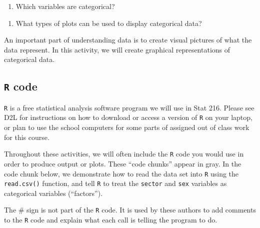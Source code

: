 \documentclass[
]{report}
\newenvironment{Shaded}{\begin{snugshade}}{\end{snugshade}}
\newcommand{\CommentTok}[1]{\textcolor[rgb]{0.56,0.35,0.01}{\textit{#1}}}
\newcommand{\KeywordTok}[1]{\textcolor[rgb]{0.13,0.29,0.53}{\textbf{#1}}}
\newcommand{\NormalTok}[1]{#1}
\newcommand{\OperatorTok}[1]{\textcolor[rgb]{0.81,0.36,0.00}{\textbf{#1}}}
\newcommand{\StringTok}[1]{\textcolor[rgb]{0.31,0.60,0.02}{#1}}
\providecommand{\tightlist}{%
  \setlength{\itemsep}{0pt}\setlength{\parskip}{0pt}}
\begin{document}
\vspace{0.2in}

\begin{enumerate}
\def\labelenumi{\arabic{enumi}.}
\setcounter{enumi}{1}
\tightlist
\item
  Which variables are categorical?
\end{enumerate}

\vspace{0.4in}

\begin{enumerate}
\def\labelenumi{\arabic{enumi}.}
\setcounter{enumi}{2}
\tightlist
\item
  What types of plots can be used to display categorical data?
\end{enumerate}

\vspace{0.5in}

An important part of understanding data is to create visual pictures of what the data represent. In this activity, we will create graphical representations of categorical data.

\hypertarget{r-code}{%
\subsection{\texorpdfstring{\texttt{R} code}{R code}}\label{r-code}}

\texttt{R} is a free statistical analysis software program we will use in Stat 216. Please see D2L for instructions on how to download or
access a version of \texttt{R} on your laptop, or plan to use the school computers for some parts of assigned out of class work for this course.

Throughout these activities, we will often include the \texttt{R} code
you would use in order to produce output or plots. These
``code chunks'' appear in gray. In the code chunk below, we
demonstrate how to read the data set into \texttt{R} using the \texttt{read.csv()} function, and tell \texttt{R} to treat the \texttt{sector} and \texttt{sex} variables as categorical variables (``factors'').

The \# sign is not part of the \texttt{R} code.
It is used by these authors to add comments to the \texttt{R} code and explain what each call is telling the program to do.

\begin{Shaded}
\end{Shaded}
\end{document}
